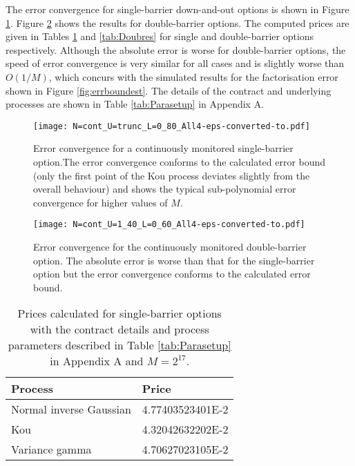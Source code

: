 \documentclass[11pt,a4paper]{article}
\begin{document}
The error convergence for single-barrier down-and-out options is shown in Figure \ref{fig:N=cont_U=trunc_L=0_80_All}. Figure \ref{fig:N=cont_U=1_40_L=0_60_All} shows the results for double-barrier options. The computed prices are given in Tables \ref{tab:Singres} and \ref{tab:Doubres} for single and double-barrier options respectively. Although the absolute error is worse for double-barrier options, the speed of error convergence is very similar for all cases and is slightly worse than $O(1/M)$, which concurs with the simulated results for the factorisation error shown in Figure \ref{fig:errboundest}. The details of the contract and underlying processes are shown in Table \ref{tab:Parasetup} in Appendix A.

\begin{figure}[h]
\begin{center}
\texttt{[image: N=cont\_U=trunc\_L=0\_80\_All4-eps-converted-to.pdf]}
\caption{Error convergence for a continuously monitored single-barrier option.The error convergence conforms to the calculated error bound (only the first point of the Kou process deviates slightly from the overall behaviour) and shows the typical sub-polynomial error convergence for higher values of $M$.}
\label{fig:N=cont_U=trunc_L=0_80_All}
\end{center}
\end{figure}

\begin{figure}[h]
\begin{center}
\texttt{[image: N=cont\_U=1\_40\_L=0\_60\_All4-eps-converted-to.pdf]}
\caption{Error convergence for the continuously monitored double-barrier option. The absolute error is worse than that for the single-barrier option but the error convergence conforms to the calculated error bound.}
\label{fig:N=cont_U=1_40_L=0_60_All}
\end{center}
\end{figure}

\begin{table}[h]
\centering
\begin{tabular}{ll}
\hline\hline
Process & Price \\
\hline
Normal inverse Gaussian & 4.77403523401E-2\\
Kou & 4.32042632202E-2\\
Variance gamma & 4.70627023105E-2\\
\hline\hline
\end{tabular}
\caption{Prices calculated for single-barrier options with the contract details and process parameters described in Table \ref{tab:Parasetup} in Appendix A and $M=2^{17}$.}
\label{tab:Singres}
\end{table}
\end{document}
